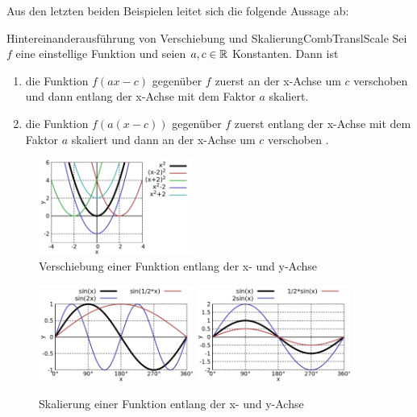 Aus den letzten beiden Beispielen leitet sich die folgende Aussage ab:

\begin{statement}{Hintereinanderausführung von Verschiebung und Skalierung}{CombTranslScale}
    Sei $f$ eine einstellige Funktion und seien $a,c\in\mathbb{R}$ Konstanten. Dann ist
    \begin{enumerate}
        \item die Funktion $f(ax-c)$ gegenüber $f$ zuerst an der x-Achse um $c$ verschoben und dann entlang der x-Achse mit dem Faktor $a$ skaliert.
        \item die Funktion $f(a(x-c))$ gegenüber $f$ zuerst entlang der x-Achse mit dem Faktor $a$ skaliert und dann an der x-Achse um $c$ verschoben .
    \end{enumerate}
\end{statement}

\begin{figure}
    \centering
    \includegraphics[width=0.45\textwidth]{./gnuplot/transform-fun-translate}
    \caption{Verschiebung einer Funktion entlang der x- und y-Achse}
    \label{fig:TransformFunTrans}
\end{figure}

\begin{figure}
    \centering
    \includegraphics[width=0.45\textwidth]{./gnuplot/transform-fun-scale-x}
    \includegraphics[width=0.45\textwidth]{./gnuplot/transform-fun-scale-y}
    \caption{Skalierung einer Funktion entlang der x- und y-Achse}
    \label{fig:TransformFunScale}
\end{figure}

